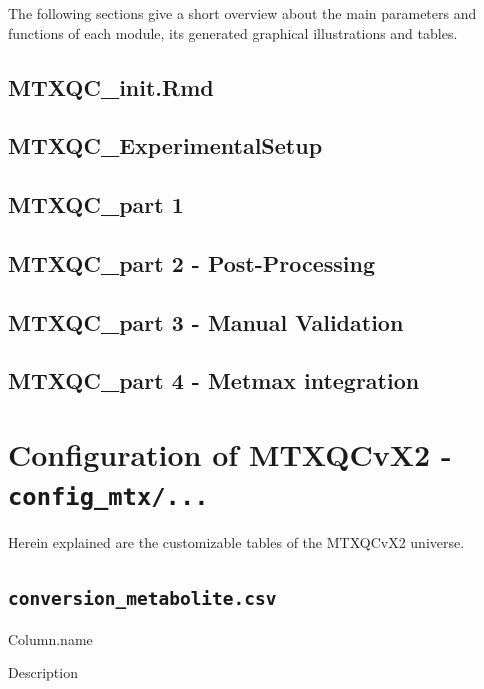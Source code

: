 \documentclass[]{book}
\theoremstyle{definition}
\theoremstyle{definition}
\theoremstyle{definition}
\theoremstyle{remark}
\begin{document}
The following sections give a short overview about the main parameters
and functions of each module, its generated graphical illustrations and
tables.

\section{MTXQC\_init.Rmd}\label{init}

\section{MTXQC\_ExperimentalSetup}\label{expsetup}

\section{MTXQC\_part 1}\label{heart}

\section{MTXQC\_part 2 - Post-Processing}\label{postproc}

\section{MTXQC\_part 3 - Manual Validation}\label{manval}

\section{MTXQC\_part 4 - Metmax integration}\label{metmax}

\chapter{\texorpdfstring{Configuration of MTXQCvX2 -
\texttt{config\_mtx/...}}{Configuration of MTXQCvX2 - config\_mtx/...}}\label{configuration-of-mtxqcvx2---config_mtx...}

Herein explained are the customizable tables of the MTXQCvX2 universe.

\section{\texorpdfstring{\texttt{conversion\_metabolite.csv}}{conversion\_metabolite.csv}}\label{conversion_metabolite.csv}

Column.name

Description
\end{document}
